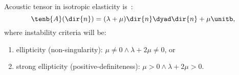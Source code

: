 \documentclass[11pt]{Z}
\begin{document}
\begin{example}
Acoustic tensor in isotropic elasticity is~\autocite{Bigoni.2012}:
\begin{equation}
\tenb{A}(\dir{n}) =  (\lambda+\mu)  \dir{n}\dyad \dir{n} + \mu\unitb,
\end{equation}
where instability criteria will be:
\begin{enumerate}
\item ellipticity (non-singularity): $\mu\neq 0 \wedge \lambda+2\mu\neq0$, or
\item strong ellipticity (positive-definiteness): $\mu> 0 \wedge \lambda+2\mu>0$.
\end{enumerate}

\end{example}




\newpage
\printbibliography[title=References,heading=bibintoc]
\end{document}
